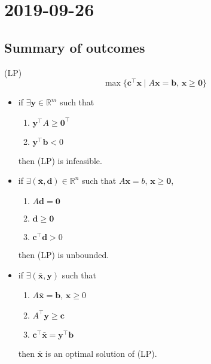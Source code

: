 \section{2019-09-26}
\subsection{Summary of outcomes}
(LP)
\[\max \{\mathbf{c}^\top \mathbf{x} \mid A\mathbf{x}=\mathbf{b}\text{, }
\mathbf{x}\ge\mathbf{0}\}\]
\begin{itemize}
    \item if $\exists \mathbf{y}\in\mathbb{R}^m$ such that
    \begin{enumerate}
        \item $\mathbf{y}^\top A\ge\mathbf{0}^\top $
        \item $\mathbf{y}^\top \mathbf{b}<0$
    \end{enumerate}
    then (LP) is infeasible.
    \item if $\exists(\bar{\mathbf{x}}, \mathbf{d})\in\mathbb{R}^n$ such that $A\mathbf{x}=b$, $\mathbf{x}\ge \mathbf{0}$, 
    \begin{enumerate}
        \item $A\mathbf{d}=\mathbf{0}$
        \item $\mathbf{d}\ge \mathbf{0}$
        \item $\mathbf{c}^\top \mathbf{d}>0$
    \end{enumerate}
    then (LP) is unbounded.
    \item if $\exists(\mathbf{\bar{x}},\mathbf{y})$ such that
    \begin{enumerate}
        \item $A\mathbf{\bar{x}}=\mathbf{b}$, $\mathbf{x}\ge 0$
        \item $A^\top \mathbf{y}\ge\mathbf{c}$
        \item $\mathbf{c}^\top  \mathbf{\bar{x}}=\mathbf{y}^\top \mathbf{b}$
    \end{enumerate}
    then $\mathbf{\bar{x}}$ is an optimal solution of (LP).
\end{itemize}

